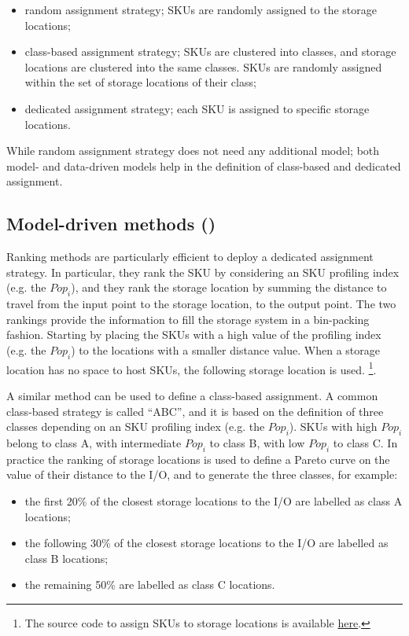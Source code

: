 \begin{itemize}
    \item random assignment strategy; SKUs are randomly assigned to the storage locations;
    \item class-based assignment strategy; SKUs are clustered into classes, and storage locations are clustered into the same classes. SKUs are randomly assigned within the set of storage locations of their class;
    \item dedicated assignment strategy; each SKU is assigned to specific storage locations.

\end{itemize}

While random assignment strategy does not need any additional model; both model- and data-driven models help in the definition of class-based and dedicated assignment.

\subsection{Model-driven methods ()}
Ranking methods are particularly efficient to deploy a dedicated assignment strategy. In particular, they rank the SKU by considering an SKU profiling index (e.g. the $Pop_i$), and they rank the storage location by summing the distance to travel from the input point to the storage location, to the output point. The two rankings provide the information to fill the storage system in a bin-packing fashion. Starting by placing the SKUs with a high value of the profiling index (e.g. the $Pop_i$) to the locations with a smaller distance value. When a storage location has no space to host SKUs, the following storage location is used. \footnote{The source code to assign SKUs to storage locations is available \href{https://github.com/aletuf93/logproj/blob/master/logproj/P2_assignmentProblem/warehousing_ABC_saving.py}{here}.}.\par

A similar method can be used to define a class-based assignment. A common class-based strategy is called “ABC”, and it is based on the definition of three classes depending on an SKU profiling index (e.g. the $Pop_i$). SKUs with high $Pop_i$ belong to class A, with intermediate $Pop_i$ to class B, with low $Pop_i$ to class C. In practice the ranking of storage locations is used to define a Pareto curve on the value of their distance to the I/O, and to generate the three classes, for example:

\begin{itemize}
    \item the first 20\% of the closest storage locations to the I/O are labelled as class A locations;
    \item the following 30\% of the closest storage locations to the I/O are labelled as class B locations;
    \item the remaining 50\% are labelled as class C locations.

\end{itemize}

